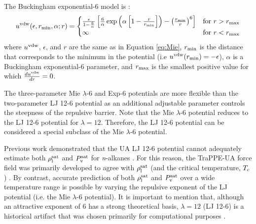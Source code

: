\documentclass[preprint,letterpaper,floatfix,citeautoscript,aip,jcp]{revtex4-1}
\begin{document}
The Buckingham exponential-6 model is \cite{Exp6}:
\begin{equation} \label{eq:Buckingham}
u^{\rm vdw}(\epsilon,r_{\rm min},\alpha;r) = 
\begin{cases}
\frac{\epsilon}{1-\frac{6}{\alpha}} \left[\frac{6}{\alpha} \exp\left(\alpha\left[1-\frac{r}{r_{\rm min}}\right]\right) - \left(\frac{r_{\rm min}}{r}\right)^6\right] & \text{for}\ r>r_{\rm max} \\
\infty           & \text{for}\ r<r_{\rm max}
\end{cases}
\end{equation}
where $u^{\rm vdw}$, $\epsilon$, and $r$ are the same as in Equation \ref{eq:Mie}, $r_{\rm min}$ is the distance that corresponds to the minimum in the potential (i.e $u^{\rm vdw}(r_{\rm min})=-\epsilon$), $\alpha$ is a Buckingham exponential-6 parameter, and $r_{\rm max}$ is the smallest positive value for which $\frac{du^{\rm vdw}}{dr}=0$.

The three-parameter Mie $\lambda$-6 and Exp-6 potentials are more flexible than the two-parameter LJ 12-6 potential as an additional adjustable parameter controls the steepness of the repulsive barrier. Note that the Mie $\lambda$-6 potential reduces to the LJ 12-6 potential for $\lambda = 12$. Therefore, the LJ 12-6 potential can be considered a special subclass of the Mie $\lambda$-6 potential. 


Previous work demonstrated that the UA LJ 12-6 potential cannot adequately estimate both $\rho_{\rm l}^{\rm sat}$ and $P_{\rm v}^{\rm sat}$ for \textit{n}-alkanes \cite{Pareto_LJPQ,Mess4}. For this reason, the TraPPE-UA force field was primarily developed to agree with $\rho_{\rm l}^{\rm sat}$ (and the critical temperature, $T_{\rm c}$) \cite{TraPPE}. By contrast, accurate prediction of both $\rho_{\rm l}^{\rm sat}$ and $P_{\rm v}^{\rm sat}$ over a wide temperature range is possible by varying the repulsive exponent of the LJ potential (i.e. the Mie $\lambda$-6 potential). It is important to mention that, although an attractive exponent of 6 has a strong theoretical basis, $\lambda = 12$ (LJ 12-6) is a historical artifact that was chosen primarily for computational purposes \cite{Allen1987}.
\end{document}
